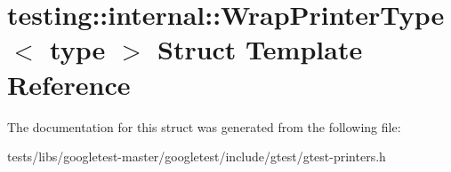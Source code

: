 \hypertarget{structtesting_1_1internal_1_1WrapPrinterType}{}\section{testing\+:\+:internal\+:\+:Wrap\+Printer\+Type$<$ type $>$ Struct Template Reference}
\label{structtesting_1_1internal_1_1WrapPrinterType}


The documentation for this struct was generated from the following file\+:\begin{DoxyCompactItemize}
\item 
tests/libs/googletest-\/master/googletest/include/gtest/gtest-\/printers.\+h\end{DoxyCompactItemize}
